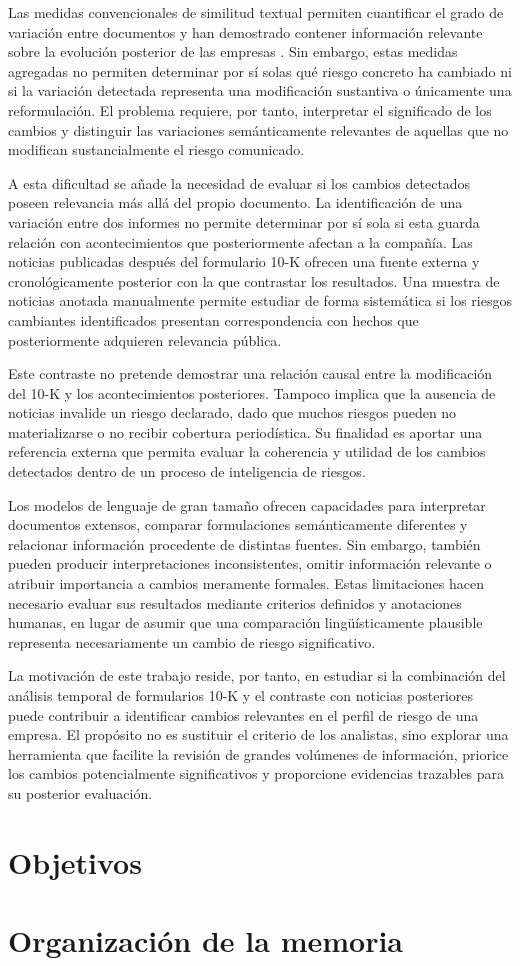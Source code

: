 Las medidas convencionales de similitud textual permiten cuantificar
el grado de variación entre documentos y han demostrado contener
información relevante sobre la evolución posterior de las empresas
\cite{cohen_malloy_nguyen_lazy_prices}. Sin embargo, estas medidas
agregadas no permiten determinar por sí solas qué riesgo concreto ha
cambiado ni si la variación detectada representa una modificación
sustantiva o únicamente una reformulación. El problema requiere, por
tanto, interpretar el significado de los cambios y distinguir las
variaciones semánticamente relevantes de aquellas que no modifican
sustancialmente el riesgo comunicado.

A esta dificultad se añade la necesidad de evaluar si los cambios detectados poseen relevancia más allá del propio documento. La identificación de una variación entre dos informes no permite determinar por sí sola si esta guarda relación con acontecimientos que posteriormente afectan a la compañía. Las noticias publicadas después del formulario 10-K ofrecen una fuente externa y cronológicamente posterior con la que contrastar los resultados. Una muestra de noticias anotada manualmente permite estudiar de forma sistemática si los riesgos cambiantes identificados presentan correspondencia con hechos que posteriormente adquieren relevancia pública.

Este contraste no pretende demostrar una relación causal entre la modificación del 10-K y los acontecimientos posteriores. Tampoco implica que la ausencia de noticias invalide un riesgo declarado, dado que muchos riesgos pueden no materializarse o no recibir cobertura periodística. Su finalidad es aportar una referencia externa que permita evaluar la coherencia y utilidad de los cambios detectados dentro de un proceso de inteligencia de riesgos.

Los modelos de lenguaje de gran tamaño ofrecen capacidades para interpretar documentos extensos, comparar formulaciones semánticamente diferentes y relacionar información procedente de distintas fuentes. Sin embargo, también pueden producir interpretaciones inconsistentes, omitir información relevante o atribuir importancia a cambios meramente formales. Estas limitaciones hacen necesario evaluar sus resultados mediante criterios definidos y anotaciones humanas, en lugar de asumir que una comparación lingüísticamente plausible representa necesariamente un cambio de riesgo significativo.

La motivación de este trabajo reside, por tanto, en estudiar si la combinación del análisis temporal de formularios 10-K y el contraste con noticias posteriores puede contribuir a identificar cambios relevantes en el perfil de riesgo de una empresa. El propósito no es sustituir el criterio de los analistas, sino explorar una herramienta que facilite la revisión de grandes volúmenes de información, priorice los cambios potencialmente significativos y proporcione evidencias trazables para su posterior evaluación.


\section{Objetivos}


\section{Organización de la memoria}

